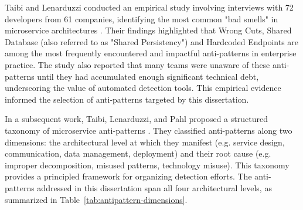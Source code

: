 \par Taibi and Lenarduzzi conducted an empirical study involving interviews with 72 developers from 61 companies, identifying the most common "bad smells" in microservice architectures \cite{Taibi2018}. Their findings highlighted that Wrong Cuts, Shared Database (also referred to as "Shared Persistency") and Hardcoded Endpoints are among the most frequently encountered and impactful anti-patterns in enterprise practice. The study also reported that many teams were unaware of these anti-patterns until they had accumulated enough significant technical debt, underscoring the value of automated detection tools. This empirical evidence informed the selection of anti-patterns targeted by this dissertation.

In a subsequent work, Taibi, Lenarduzzi, and Pahl proposed a structured taxonomy of microservice anti-patterns \cite{Taibi2020}. They classified anti-patterns along two dimensions: the architectural level at which they manifest (e.g. service design, communication, data management, deployment) and their root cause (e.g. improper decomposition, misused patterns, technology misuse). This taxonomy provides a principled framework for organizing detection efforts. The anti-patterns addressed in this dissertation span all four architectural levels, as summarized in Table~\ref{tab:antipattern-dimensions}.

